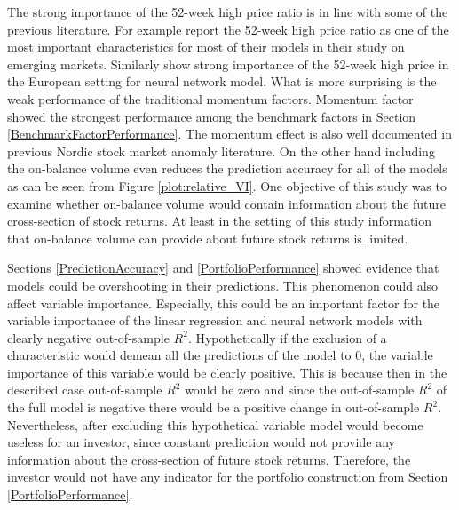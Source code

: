 \documentclass[12pt]{article}
\begin{document}
The strong importance of the 52-week high price ratio is in line with some of the previous literature. For example \citet{HANAUER2023} report the 52-week high price ratio as one of the most important characteristics for most of their models in their study on emerging markets. Similarly \citet{TOBEK2021100588} show strong importance of the 52-week high price in the European setting for neural network model.\footnotemark {} What is more surprising is the weak performance of the traditional momentum factors. Momentum factor showed the strongest performance among the benchmark factors in Section \ref{BenchmarkFactorPerformance}. The momentum effect is also well documented in previous Nordic stock market anomaly literature.\footnotemark {} On the other hand including the on-balance volume even reduces the prediction accuracy for all of the models as can be seen from Figure \ref{plot:relative_VI}. One objective of this study was to examine whether on-balance volume would contain information about the future cross-section of stock returns. At least in the setting of this study information that on-balance volume can provide about future stock returns is limited. \par

Sections \ref{PredictionAccuracy} and \ref{PortfolioPerformance} showed evidence that models could be overshooting in their predictions. This phenomenon could also affect variable importance. Especially, this could be an important factor for the variable importance of the linear regression and neural network models with clearly negative out-of-sample $R^2$. Hypothetically if the exclusion of a characteristic would demean all the predictions of the model to 0, the variable importance of this variable would be clearly positive. This is because then in the described case out-of-sample $R^2$ would be zero and since the out-of-sample $R^2$ of the full model is negative there would be a positive change in out-of-sample $R^2$. Nevertheless, after excluding this hypothetical variable model would become useless for an investor, since constant prediction would not provide any information about the cross-section of future stock returns. Therefore, the investor would not have any indicator for the portfolio construction from Section \ref{PortfolioPerformance}. \par
\end{document}
